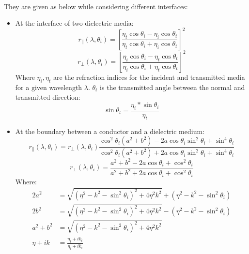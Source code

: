 \begin{itemize}
          They are given as below while considering different interfaces:
          \begin{itemize}
              \item At the interface of two dielectric media:
                    \[
                        r_{\parallel}(\lambda, \theta_i) = \left[\frac{\eta_t \cos\theta_i - \eta_i\cos\theta_t}{\eta_t\cos\theta_i + \eta_i\cos\theta_t}\right]^2
                    \]
                    \[
                        r_{\perp}(\lambda, \theta_i) = \left[\frac{\eta_i \cos\theta_i - \eta_t\cos\theta_t}{\eta_i\cos\theta_i + \eta_t\cos\theta_t}\right]^2
                    \]
                    Where $\eta_i, \eta_t$ are the refraction indices for the incident and transmitted media for a given wavelength $\lambda$.
                    $\theta_t$ is the transmitted angle between the normal and transmitted direction:
                    \[
                        \sin\theta_t = \frac{\eta_i * \sin\theta_i}{\eta_t}
                    \]
              \item At the boundary between a conductor and a dielectric medium:
                    \[
                        r_{\parallel}(\lambda, \theta_i) = r_\perp(\lambda, \theta_i) \frac{\cos^2\theta_i(a^2 + b^2) - 2a\cos\theta_i\sin^2\theta_i + \sin^4\theta_i}%
                        {\cos^2\theta_i(a^2 + b^2) + 2a\cos\theta_i\sin^2\theta_i + \sin^4\theta_i}
                    \]
                    \[
                        r_{\perp}(\lambda, \theta_i) = \frac{a^2 + b^2 -2a\cos\theta_i + \cos^2\theta_i}{a^2 + b^2 +2a\cos\theta_i + \cos^2\theta_i}
                    \]
                    Where:
                    \[
                        \begin{array}{lll}
                            2a^2                        & = \sqrt{(\eta^2 -k^2 -\sin^2\theta_i)^2 + 4\eta^2 k^2 } + (\eta^2 - k^2 -\sin^2\theta_i) \\
                            2b^2                        & = \sqrt{(\eta^2 -k^2 -\sin^2\theta_i)^2 + 4\eta^2 k^2 } - (\eta^2 - k^2 -\sin^2\theta_i) \\
                            a^2 + b^2                   & = \sqrt{(\eta^2 -k^2 -\sin^2\theta_i)^2 + 4\eta^2 k^2 }                                                    \\
                            \eta + ik & = \frac{\eta_t + ik_t}{\eta_i+ ik_i}
                        \end{array}
                    \]

          \end{itemize}


\end{itemize}
